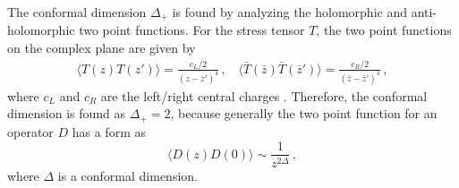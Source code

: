 \documentclass[11pt,a4paper]{article}
\begin{document}
The conformal dimension $\Delta_+$ is found by analyzing the holomorphic and anti-holomorphic two point functions. For the stress tensor $T$, the two point functions on the complex plane are given by
\begin{eqnarray}
\langle T(z) T(z')\rangle=\frac{c_L/2}{(z-z')^4}\,,~~~~\langle \bar{T}(\bar{z})\bar{T}(\bar{z}')\rangle=
\frac{c_R/2}{(\bar{z}-\bar{z}')^4}\,,
\end{eqnarray}
where $c_L$ and $c_R$ are the left/right central charges \cite{Liu:2020yaf}. Therefore, the conformal dimension is found as $\Delta_+=2$, because generally the two point function for an operator $D$ has a form as
\begin{equation}
    \langle D(z) D(0)\rangle \sim \frac{1}{z^{2\Delta}}\,,
\end{equation}
where $\Delta$ is a conformal dimension.


%

\end{document}
